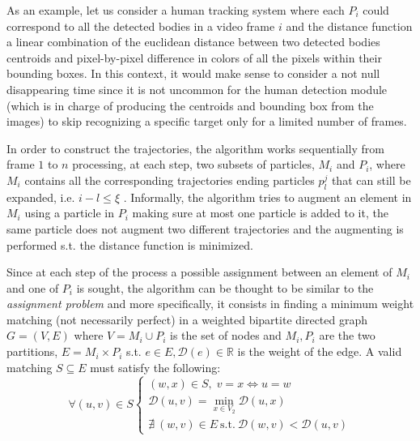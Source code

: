 As an example, let us consider a human tracking system where each $P_i$ could correspond to all the detected bodies in a  video frame $i$ and the distance function a linear combination of the euclidean distance between two detected bodies centroids  and pixel-by-pixel difference in colors of all the pixels within their bounding boxes. In this context, it would make sense to consider a not null disappearing time since it is not uncommon for the human detection module (which is in charge of producing the centroids and bounding box from the images) to skip recognizing a specific target only for a limited number of frames. 


In order to construct the trajectories, the algorithm works sequentially from frame $1$ to $n$ processing, at each step, two subsets of particles, $M_i$ and $P_{i}$, where $M_i$ contains all the corresponding trajectories ending particles $p^{j}_l$ that can still be expanded, i.e. $i-l \leq \xi$ .
Informally, the algorithm tries to augment an element in $M_i$ using a particle in $P_i$ making sure at most one particle is added to it, the same particle does not augment two different trajectories and the augmenting is performed s.t. the distance function is minimized.

Since at each step of the process a possible assignment between an element of $M_i$ and one of $P_i$ is sought, the algorithm can be thought to be similar to the \textit{assignment problem} \cite{bellmann1978} and more specifically, it consists in finding a minimum weight matching (not necessarily perfect) in  a weighted bipartite directed graph $G=(V,E)$ where $V={M_i} \cup P_i$ is the set of nodes and ${M_i}, P_i$ are the two partitions, $E = {M_i} \times P_i$ s.t. $e \in E, \mathcal{D}(e) \in \mathbb{R}$ is the weight of the edge.
A valid matching $S \subseteq E$ must satisfy the following: 
\begin{equation}
\forall (u,v) \in S 
\left\{
  \begin{array}{lr}
   (w,x) \in S,\; v=x\Longleftrightarrow u=w\\
   \mathcal{D}(u,v) = \min_{x \in V_2} \mathcal{D}(u,x)  \\
    \nexists \: (w,v) \in E \: \mbox{s.t.} \: \mathcal{D}(w,v) < \mathcal{D}(u,v)
  \end{array}
\right.
\label{matchConstraints}
\end{equation}

